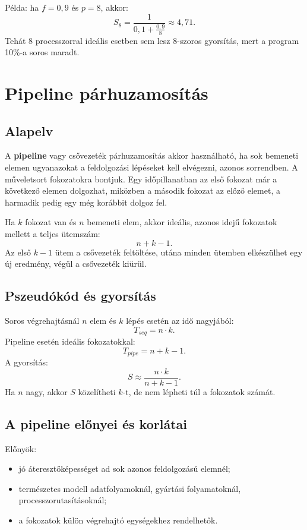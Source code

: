 Példa: ha $f=0{,}9$ és $p=8$, akkor:
\[
  S_8=\frac{1}{0{,}1+\frac{0{,}9}{8}}\approx 4{,}71.
\]
Tehát 8 processzorral ideális esetben sem lesz 8-szoros gyorsítás, mert a program 10\%-a soros maradt.

\section{Pipeline párhuzamosítás}

\subsection{Alapelv}

A \textbf{pipeline} vagy csővezeték párhuzamosítás akkor használható, ha sok bemeneti elemen ugyanazokat a feldolgozási lépéseket kell elvégezni, azonos sorrendben. A műveletsort fokozatokra bontjuk. Egy időpillanatban az első fokozat már a következő elemen dolgozhat, miközben a második fokozat az előző elemet, a harmadik pedig egy még korábbit dolgoz fel.



Ha $k$ fokozat van és $n$ bemeneti elem, akkor ideális, azonos idejű fokozatok mellett a teljes ütemszám:
\[
  n+k-1.
\]
Az első $k-1$ ütem a csővezeték feltöltése, utána minden ütemben elkészülhet egy új eredmény, végül a csővezeték kiürül.

\subsection{Pszeudókód és gyorsítás}


Soros végrehajtásnál $n$ elem és $k$ lépés esetén az idő nagyjából:
\[
  T_{seq}=n\cdot k.
\]
Pipeline esetén ideális fokozatokkal:
\[
  T_{pipe}=n+k-1.
\]
A gyorsítás:
\[
  S\approx\frac{n\cdot k}{n+k-1}.
\]
Ha $n$ nagy, akkor $S$ közelítheti $k$-t, de nem lépheti túl a fokozatok számát.

\subsection{A pipeline előnyei és korlátai}

Előnyök:

\begin{itemize}
  \item jó áteresztőképességet ad sok azonos feldolgozású elemnél;
  \item természetes modell adatfolyamoknál, gyártási folyamatoknál, processzorutasításoknál;
  \item a fokozatok külön végrehajtó egységekhez rendelhetők.
\end{itemize}

